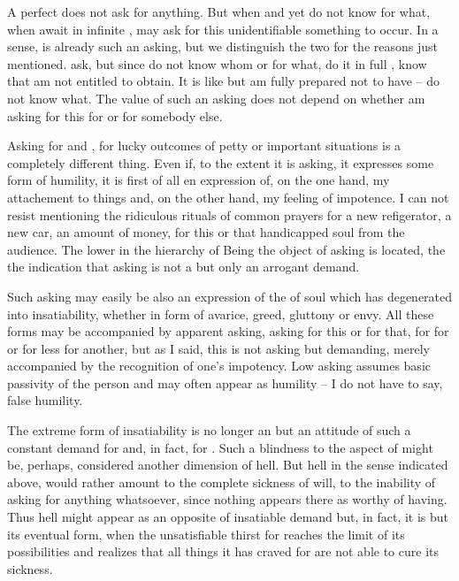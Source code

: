\subpa 
A perfect  does not ask for anything.  But
when   and yet do not know for what, when  await
in infinite ,  may ask for this unidentifiable
something to occur.  In a sense,  is already such an
asking, but we distinguish the two for the reasons just mentioned. 
 ask, but since  do not know whom or for what,  do
it in full ,  know that  am not entitled to
obtain.  It is like  but  am fully
prepared not to have --  do not know what.  The value of such an
asking does not depend on whether  am asking for this for
 or for somebody else.

Asking for  and , for lucky outcomes of petty
or important situations is a completely different thing.  Even if, to 
the extent it is asking, it expresses some form of humility, it is 
first of all en expression of, on the one hand, my attachement to 
things and, on the other hand, my feeling of impotence. 
I can not resist mentioning the ridiculous rituals of common prayers 
for a new refigerator, a new car, an amount of money, for this or 
that handicapped soul from the audience. The lower in the hierarchy of 
Being the object of asking is located, the  the indication 
that asking is not a  but only an arrogant demand. 

\subpa Such asking may easily be also an expression of the  of
soul which has degenerated into insatiability, whether in form of
avarice, greed, gluttony or envy.  All these forms may be accompanied
by apparent asking, asking for this or for that, for  for
 or for less for another, but as I said, this is not asking
but demanding, merely accompanied by the recognition of one's
impotency.  Low asking assumes basic passivity of the person and may 
often appear as 
humility -- I do not have to say, false humility.

The extreme form of insatiability is no longer an 
but an attitude of such a constant demand for  and, in fact, 
 for . Such a blindness to the  
aspect of  might be, perhaps, considered another 
dimension of hell. But hell in the sense indicated above, would 
rather amount to the complete sickness of will, to the inability of 
asking for anything whatsoever, since nothing appears there as worthy 
of having. Thus hell might appear as an opposite of insatiable demand 
but, in fact, it is but its eventual form, when the unsatisfiable 
thirst for  reaches the limit of its possibilities and 
realizes that all things it has craved for are not able to cure its 
sickness. 

